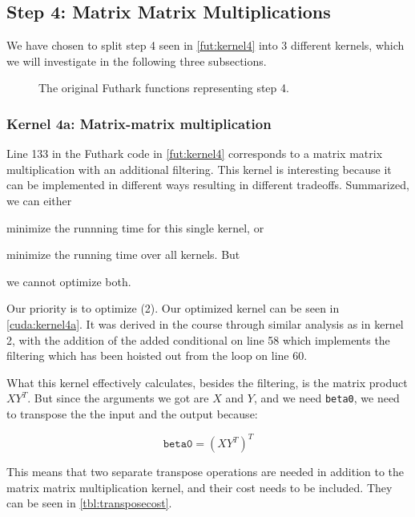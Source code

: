 \subsection{Step 4: Matrix Matrix Multiplications}

We have chosen to split step 4 seen in \autoref{fut:kernel4} into 3 different
kernels, which we will investigate in the following three subsections.

\begin{figure}[H]
    \centering
    \caption{The original Futhark functions representing step 4.}
    \label{fut:kernel4}
\end{figure}

\subsubsection{Kernel 4a: Matrix-matrix multiplication}

Line 133 in the Futhark code in \autoref{fut:kernel4} corresponds to a matrix
matrix multiplication with an additional filtering. 
%
This kernel is interesting because it can be implemented in different ways
resulting in different tradeoffs. Summarized, we can either 
%
\begin{enumerate*}[label=(\arabic*)]
    \item minimize the runnning time for this single kernel, or
    \item minimize the running time over all kernels. But
    \item we cannot optimize both.
\end{enumerate*}
%
Our priority is to optimize (2).
%
Our optimized kernel  can be seen in \autoref{cuda:kernel4a}. It was derived in
the course through similar analysis as in kernel 2, with the addition of the
added conditional on line 58 which implements the filtering which has been
hoisted out from the loop on line 60.  %

What this kernel effectively calculates, besides the filtering, is 
the matrix product \(XY^T\). But since the arguments we got are \(X\) and \(Y\),
and we need \texttt{beta0}, we need to transpose the the input and the output
because:

\[ \texttt{beta0} = (XY^T)^T  \]

This means that two separate transpose operations are needed in addition to the
matrix matrix multiplication kernel, and their cost needs to be included. They
can be seen in \autoref{tbl:transposecost}.



